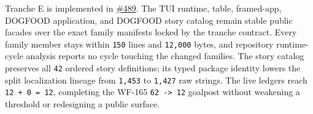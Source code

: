 Tranche E is implemented in \href{https://github.com/flyingrobots/bijou/pull/489}{\#489}. The TUI runtime, table, framed-app, DOGFOOD application, and DOGFOOD story catalog remain stable public facades over the exact family manifests locked by the tranche contract. Every family member stays within \texttt{1\allowbreak{}5\allowbreak{}0} lines and \texttt{1\allowbreak{}2\allowbreak{},\allowbreak{}0\allowbreak{}0\allowbreak{}0} bytes, and repository runtime-cycle analysis reports no cycle touching the changed families. The story catalog preserves all \texttt{4\allowbreak{}2} ordered story definitions; its typed package identity lowers the split localization lineage from \texttt{1\allowbreak{},\allowbreak{}4\allowbreak{}5\allowbreak{}3} to \texttt{1\allowbreak{},\allowbreak{}4\allowbreak{}2\allowbreak{}7} raw strings. The live ledgers reach \texttt{1\allowbreak{}2\allowbreak{} \allowbreak{}+\allowbreak{} \allowbreak{}0\allowbreak{} \allowbreak{}=\allowbreak{} \allowbreak{}1\allowbreak{}2}, completing the WF-165 \texttt{6\allowbreak{}2\allowbreak{} \allowbreak{}-\allowbreak{}>\allowbreak{} \allowbreak{}1\allowbreak{}2} goalpost without weakening a threshold or redesigning a public surface.

